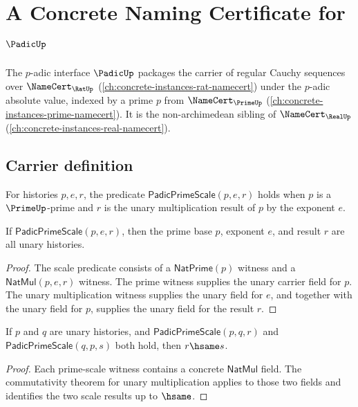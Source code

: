 \chapter{A Concrete Naming Certificate for $\PadicUp$}
\label{ch:concrete-instances-padic-namecert}

The $p$-adic interface $\PadicUp$ packages the carrier of regular Cauchy sequences over $\NameCert_{\RatUp}$ (\autoref{ch:concrete-instances-rat-namecert}) under the $p$-adic absolute value, indexed by a prime $p$ from $\NameCert_{\PrimeUp}$ (\autoref{ch:concrete-instances-prime-namecert}). It is the non-archimedean sibling of $\NameCert_{\RealUp}$ (\autoref{ch:concrete-instances-real-namecert}).

\section{Carrier definition}
\label{sec:padic-carrier}

\begin{definition}
\label{def:padic-prime-scale}
For histories \(p,e,r\), the predicate \(\mathsf{PadicPrimeScale}(p,e,r)\)
holds when \(p\) is a \(\PrimeUp\)-prime and \(r\) is the unary multiplication
result of \(p\) by the exponent \(e\).
\end{definition}

\begin{theorem}
\label{thm:padic-prime-scale-unary-components}
If \(\mathsf{PadicPrimeScale}(p,e,r)\), then the prime base \(p\), exponent
\(e\), and result \(r\) are all unary histories.
\end{theorem}
\begin{proof}
The scale predicate consists of a \(\mathsf{NatPrime}(p)\) witness and a
\(\mathsf{NatMul}(p,e,r)\) witness. The prime witness supplies the unary
carrier field for \(p\). The unary multiplication witness supplies the unary
field for \(e\), and together with the unary field for \(p\), supplies the
unary field for the result \(r\).
\end{proof}

\begin{theorem}
\label{thm:padic-prime-scale-prime-exponent-comm}
If \(p\) and \(q\) are unary histories, and
\(\mathsf{PadicPrimeScale}(p,q,r)\) and \(\mathsf{PadicPrimeScale}(q,p,s)\)
both hold, then \(r\hsame s\).
\end{theorem}
\begin{proof}
Each prime-scale witness contains a concrete \(\mathsf{NatMul}\) field. The
commutativity theorem for unary multiplication applies to those two fields and
identifies the two scale results up to \(\hsame\).
\end{proof}

